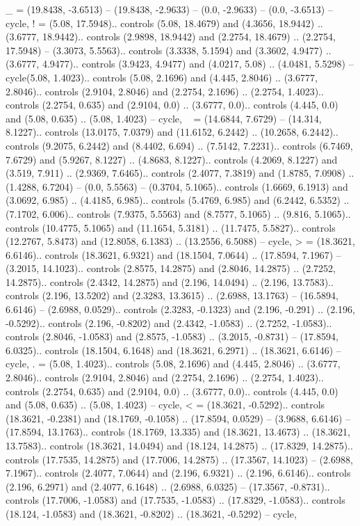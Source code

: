{_} = {(19.8438, -3.6513) -- (19.8438, -2.9633) -- (0.0, -2.9633) -- (0.0, -3.6513) -- cycle},
{!} = {(5.08, 17.5948).. controls (5.08, 18.4679) and (4.3656, 18.9442) .. (3.6777, 18.9442).. controls (2.9898, 18.9442) and (2.2754, 18.4679) .. (2.2754, 17.5948) -- (3.3073, 5.5563).. controls (3.3338, 5.1594) and (3.3602, 4.9477) .. (3.6777, 4.9477).. controls (3.9423, 4.9477) and (4.0217, 5.08) .. (4.0481, 5.5298) -- cycle(5.08, 1.4023).. controls (5.08, 2.1696) and (4.445, 2.8046) .. (3.6777, 2.8046).. controls (2.9104, 2.8046) and (2.2754, 2.1696) .. (2.2754, 1.4023).. controls (2.2754, 0.635) and (2.9104, 0.0) .. (3.6777, 0.0).. controls (4.445, 0.0) and (5.08, 0.635) .. (5.08, 1.4023) -- cycle},
{~} = {(14.6844, 7.6729) -- (14.314, 8.1227).. controls (13.0175, 7.0379) and (11.6152, 6.2442) .. (10.2658, 6.2442).. controls (9.2075, 6.2442) and (8.4402, 6.694) .. (7.5142, 7.2231).. controls (6.7469, 7.6729) and (5.9267, 8.1227) .. (4.8683, 8.1227).. controls (4.2069, 8.1227) and (3.519, 7.911) .. (2.9369, 7.6465).. controls (2.4077, 7.3819) and (1.8785, 7.0908) .. (1.4288, 6.7204) -- (0.0, 5.5563) -- (0.3704, 5.1065).. controls (1.6669, 6.1913) and (3.0692, 6.985) .. (4.4185, 6.985).. controls (5.4769, 6.985) and (6.2442, 6.5352) .. (7.1702, 6.006).. controls (7.9375, 5.5563) and (8.7577, 5.1065) .. (9.816, 5.1065).. controls (10.4775, 5.1065) and (11.1654, 5.3181) .. (11.7475, 5.5827).. controls (12.2767, 5.8473) and (12.8058, 6.1383) .. (13.2556, 6.5088) -- cycle},
{>} = {(18.3621, 6.6146).. controls (18.3621, 6.9321) and (18.1504, 7.0644) .. (17.8594, 7.1967) -- (3.2015, 14.1023).. controls (2.8575, 14.2875) and (2.8046, 14.2875) .. (2.7252, 14.2875).. controls (2.4342, 14.2875) and (2.196, 14.0494) .. (2.196, 13.7583).. controls (2.196, 13.5202) and (2.3283, 13.3615) .. (2.6988, 13.1763) -- (16.5894, 6.6146) -- (2.6988, 0.0529).. controls (2.3283, -0.1323) and (2.196, -0.291) .. (2.196, -0.5292).. controls (2.196, -0.8202) and (2.4342, -1.0583) .. (2.7252, -1.0583).. controls (2.8046, -1.0583) and (2.8575, -1.0583) .. (3.2015, -0.8731) -- (17.8594, 6.0325).. controls (18.1504, 6.1648) and (18.3621, 6.2971) .. (18.3621, 6.6146) -- cycle},
{.} = {(5.08, 1.4023).. controls (5.08, 2.1696) and (4.445, 2.8046) .. (3.6777, 2.8046).. controls (2.9104, 2.8046) and (2.2754, 2.1696) .. (2.2754, 1.4023).. controls (2.2754, 0.635) and (2.9104, 0.0) .. (3.6777, 0.0).. controls (4.445, 0.0) and (5.08, 0.635) .. (5.08, 1.4023) -- cycle},
{<} = {(18.3621, -0.5292).. controls (18.3621, -0.2381) and (18.1769, -0.1058) .. (17.8594, 0.0529) -- (3.9688, 6.6146) -- (17.8594, 13.1763).. controls (18.1769, 13.335) and (18.3621, 13.4673) .. (18.3621, 13.7583).. controls (18.3621, 14.0494) and (18.124, 14.2875) .. (17.8329, 14.2875).. controls (17.7535, 14.2875) and (17.7006, 14.2875) .. (17.3567, 14.1023) -- (2.6988, 7.1967).. controls (2.4077, 7.0644) and (2.196, 6.9321) .. (2.196, 6.6146).. controls (2.196, 6.2971) and (2.4077, 6.1648) .. (2.6988, 6.0325) -- (17.3567, -0.8731).. controls (17.7006, -1.0583) and (17.7535, -1.0583) .. (17.8329, -1.0583).. controls (18.124, -1.0583) and (18.3621, -0.8202) .. (18.3621, -0.5292) -- cycle},
